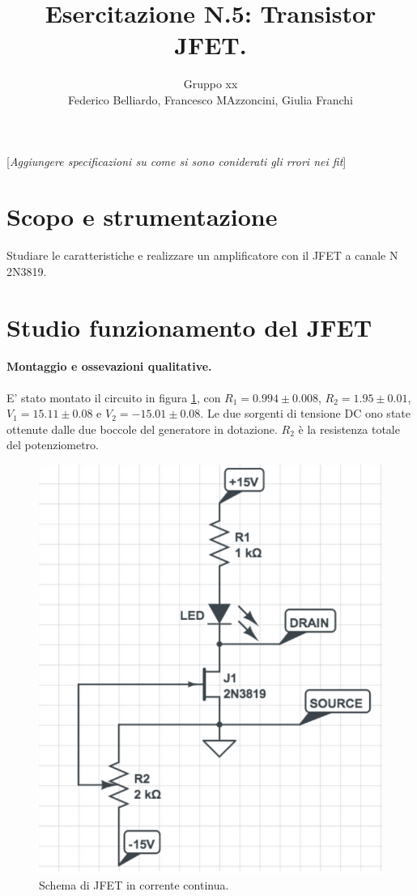\documentclass[10pt,a4paper]{article}
\author{Gruppo xx \\ Federico Belliardo, Francesco MAzzoncini, Giulia Franchi}
\title{Esercitazione N.5: Transistor JFET.}
\newcommand{\rem}[1]{[\emph{#1}]}
\begin{document}
\maketitle

\rem{Aggiungere specificazioni su come si sono coniderati gli rrori nei fit}
\section{Scopo e strumentazione}
Studiare le caratteristiche e realizzare un amplificatore con il JFET a canale N 2N3819.


\section{Studio funzionamento del JFET}
\paragraph{Montaggio e ossevazioni qualitative.}
E' stato montato il circuito in figura \ref{circuito1}, con  $R_1 = 0.994\pm0.008$, $R_2 = 1.95 \pm 0.01$, $V_1 = 15.11\pm0.08 $ e $V_2 = -15.01\pm0.08$. Le due sorgenti di tensione DC ono state ottenute dalle due boccole del generatore in dotazione. $R_2$ è la resistenza totale del potenziometro.

\begin{figure}
\centering
\includegraphics[scale=0.4]{circuito1.png}
\caption{Schema di JFET in corrente continua.\label{circuito1}}
\end{figure}
\end{document}
